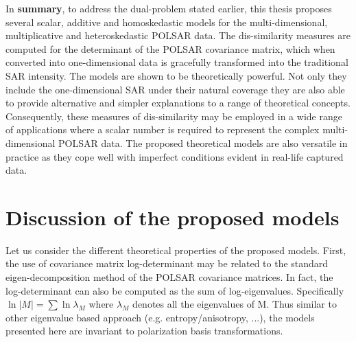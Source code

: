 

In \textbf{summary}, to address the dual-problem stated earlier, this thesis proposes several
scalar, additive and homoskedastic models for the multi-dimensional, multiplicative
and heteroskedastic POLSAR data. 
The dis-similarity measures are computed for the determinant of the POLSAR covariance matrix,
  which when converted into one-dimensional data
  is gracefully transformed into the traditional SAR intensity.
The models are shown to be theoretically powerful.
Not only they include the one-dimensional SAR under their natural coverage 
they are also able to provide alternative and simpler explanations to a range of theoretical concepts. 
Consequently, these measures of dis-similarity may be employed in a wide range of applications
  where a scalar number is required to represent the complex multi-dimensional POLSAR data.
The proposed theoretical models are also versatile in practice
  as they cope well with imperfect conditions evident in real-life captured data.

\section{Discussion of the proposed models}

Let us consider the different theoretical properties of the proposed models.
First, the use of covariance matrix log-determinant may be related to the standard eigen-decomposition method of the POLSAR covariance matrices.
In fact, the log-determinant can also be computed as the sum of log-eigenvalues.
Specifically $\ln{|M|} = \sum \ln{\lambda_M}$ where $\lambda_M$ denotes all the eigenvalues of M.
Thus similar to other eigenvalue based approach (e.g. entropy/anisotropy, ...),
  the models presented here are invariant to polarization basis transformations.

